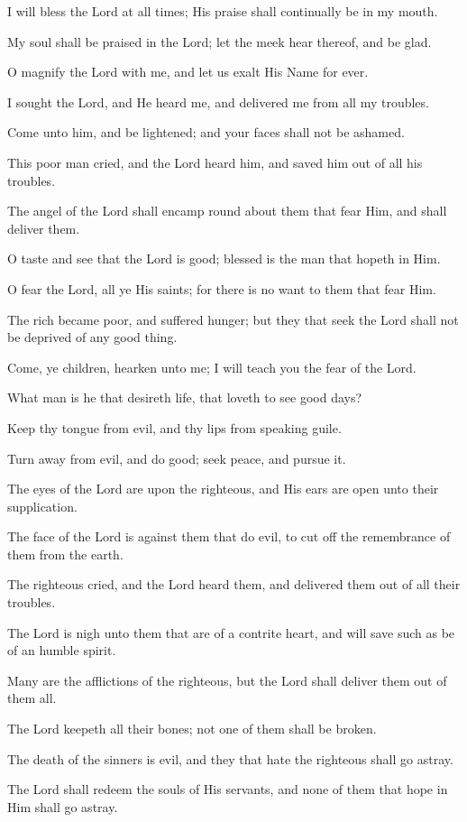 I will bless the Lord at all times; His praise shall continually be in my mouth.

My soul shall be praised in the Lord; let the meek hear thereof, and be glad.

O magnify the Lord with me, and let us exalt His Name for ever.

I sought the Lord, and He heard me, and delivered me from all my troubles.

Come unto him, and be lightened; and your faces shall not be ashamed.

This poor man cried, and the Lord heard him, and saved him out of all his troubles.

The angel of the Lord shall encamp round about them that fear Him, and shall deliver them.

O taste and see that the Lord is good; blessed is the man that hopeth in Him.

O fear the Lord, all ye His saints; for there is no want to them that fear Him.

The rich became poor, and suffered hunger; but they that seek the Lord shall not be deprived of any good thing.

Come, ye children, hearken unto me; I will teach you the fear of the Lord.

What man is he that desireth life, that loveth to see good days?

Keep thy tongue from evil, and thy lips from speaking guile.

Turn away from evil, and do good; seek peace, and pursue it.

The eyes of the Lord are upon the righteous, and His ears are open unto their supplication.

The face of the Lord is against them that do evil, to cut off the remembrance of them from the earth.

The righteous cried, and the Lord heard them, and delivered them out of all their troubles.

The Lord is nigh unto them that are of a contrite heart, and will save such as be of an humble spirit.

Many are the afflictions of the righteous, but the Lord shall deliver them out of them all.

The Lord keepeth all their bones; not one of them shall be broken.

The death of the sinners is evil, and they that hate the righteous shall go astray.

The Lord shall redeem the souls of His servants, and none of them that hope in Him shall go astray.
